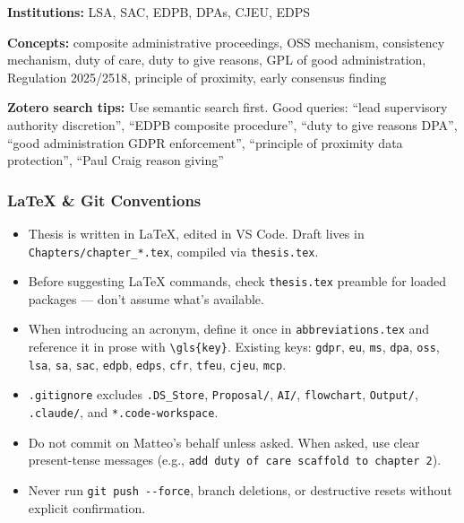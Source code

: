\textbf{Institutions:} LSA, SAC, EDPB, DPAs, CJEU, EDPS

\textbf{Concepts:} composite administrative proceedings, OSS mechanism,
consistency mechanism, duty of care, duty to give reasons, GPL of good
administration, Regulation 2025/2518, principle of proximity, early consensus
finding

\textbf{Zotero search tips:} Use semantic search first. Good queries: ``lead
supervisory authority discretion'', ``EDPB composite procedure'', ``duty to give
reasons DPA'', ``good administration GDPR enforcement'', ``principle of proximity
data protection'', ``Paul Craig reason giving''

\subsubsection{LaTeX \& Git Conventions}

\begin{itemize}
  \item Thesis is written in LaTeX, edited in VS Code. Draft lives in
        \texttt{Chapters/chapter\_*.tex}, compiled via \texttt{thesis.tex}.
  \item Before suggesting LaTeX commands, check \texttt{thesis.tex} preamble for
        loaded packages --- don't assume what's available.
  \item When introducing an acronym, define it once in \texttt{abbreviations.tex}
        and reference it in prose with \texttt{\textbackslash{}gls\{key\}}.
        Existing keys: \texttt{gdpr}, \texttt{eu}, \texttt{ms}, \texttt{dpa},
        \texttt{oss}, \texttt{lsa}, \texttt{sa}, \texttt{sac}, \texttt{edpb},
        \texttt{edps}, \texttt{cfr}, \texttt{tfeu}, \texttt{cjeu}, \texttt{mcp}.
  \item \texttt{.gitignore} excludes \texttt{.DS\_Store}, \texttt{Proposal/},
        \texttt{AI/}, \texttt{flowchart}, \texttt{Output/}, \texttt{.claude/}, and
        \texttt{*.code-workspace}.
  \item Do not commit on Matteo's behalf unless asked. When asked, use clear
        present-tense messages (e.g., \texttt{add duty of care scaffold to
        chapter 2}).
  \item Never run \texttt{git push -{}-force}, branch deletions, or destructive
        resets without explicit confirmation.
\end{itemize}

